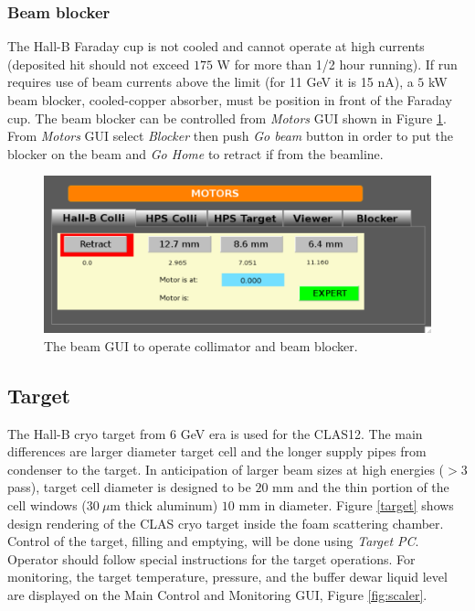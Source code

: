 \documentclass[12pt]{article}
\begin{document}
\subsubsection{Beam blocker}
\label{subsec:blocker}
\indent

The Hall-B Faraday cup is not cooled and cannot operate at high currents (deposited hit should not exceed $175$ W for more than 1/2 hour running). If run requires use of beam currents above the limit (for 11 GeV it is 15 nA), a $5$ kW beam blocker, cooled-copper absorber, must be position in front of the Faraday cup. The beam blocker can be controlled from {\it Motors} GUI shown in Figure \ref{fig:beamblocker}.  From {\it Motors} GUI select {\it Blocker} then push {\it Go beam} button  in order to put the blocker on the beam and {\it Go Home} to retract if from the beamline. 

\begin{figure}[tbhp]
{\centering \includegraphics[scale=0.65]{collimator.pdf} \par}
\caption{The beam GUI to operate collimator and beam blocker. \label{fig:beamblocker}}
\end{figure}


\clearpage

\subsection{\bf Target}
\indent

The Hall-B cryo target from $6$ GeV era is used for the CLAS12. The main differences are larger diameter target cell and the longer supply pipes from condenser to the target. In anticipation of larger beam sizes at high energies ($> 3$ pass), target cell diameter is designed to be $20$ mm and the thin portion of the cell windows ($30~\mu$m thick aluminum) $10$ mm in diameter. Figure \ref{target} shows design rendering of the CLAS cryo target inside the foam scattering chamber. Control of the target, filling and emptying, will be done using {\it Target PC}. Operator should follow special instructions for the target operations. For monitoring, the target temperature, pressure, and the buffer dewar liquid level are displayed on the Main Control and Monitoring GUI, Figure \ref{fig:scaler}. 
\end{document}
